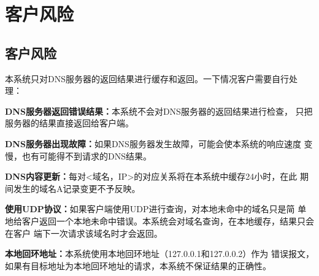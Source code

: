%
%
\section{客户风险} 
\subsection{客户风险}
本系统只对DNS服务器的返回结果进行缓存和返回。一下情况客户需要自行处理：
\begin{compactitem}
\item{\textbf{DNS服务器返回错误结果：}本系统不会对DNS服务器的返回结果进行检查，
	只把服务器的结果直接返回给客户端。} 
\item{\textbf{DNS服务器出现故障：}如果DNS服务器发生故障，可能会使本系统的响应速度
变慢，也有可能得不到请求的DNS结果。}
\item{\textbf{DNS内容更新：}每对<域名，IP>的对应关系将在本系统中缓存24小时，在此
期间发生的域名A记录变更不予反映。} 
\item{\textbf{使用UDP协议：}如果客户端使用UDP进行查询，对本地未命中的域名只是简
单地给客户返回一个本地未命中错误。本系统会对域名查询，在本地缓存，结果只会在客户
端下一次请求该域名时才会返回。}
\item{\textbf{本地回环地址：}本系统使用本地回环地址（127.0.0.1和127.0.0.2）作为
错误报文，如果有目标地址为本地回环地址的请求，本系统不保证结果的正确性。}
\end{compactitem}

%
